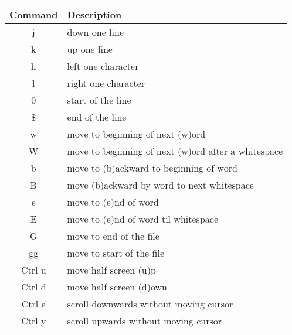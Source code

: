 \documentclass[12pt, letterpaper]{article}
\begin{document}
\begin{table}[H]
    \begin{tabular}{|c|p{9cm}|}
        Command & Description \\
        \hline
        j & down one line \\
        \hline
        k & up one line \\
        \hline

        h & left one character \\
        \hline

        l & right one character \\
        \hline

        0 & start of the line \\
        \hline

        \$ & end of the line \\
        \hline

        w & move to beginning of next (w)ord \\
        \hline

        W & move to beginning of next (w)ord after a whitespace \\
        \hline

        b & move to (b)ackward to beginning of word  \\
        \hline

        B & move (b)ackward by word to next whitespace \\
        \hline

        e & move to (e)nd of word \\
        \hline

        E & move to (e)nd of word til whitespace \\
        \hline

        G & move to end of the file \\
        \hline

        gg & move to start of the file \\
        \hline

        Ctrl u & move half screen (u)p \\
        \hline

        Ctrl d & move half screen (d)own \\
        \hline

        Ctrl e & scroll downwards without moving cursor \\
        \hline

        Ctrl y & scroll upwards without moving cursor \\
        \hline


\end{tabular}
\end{table}
\end{document}
